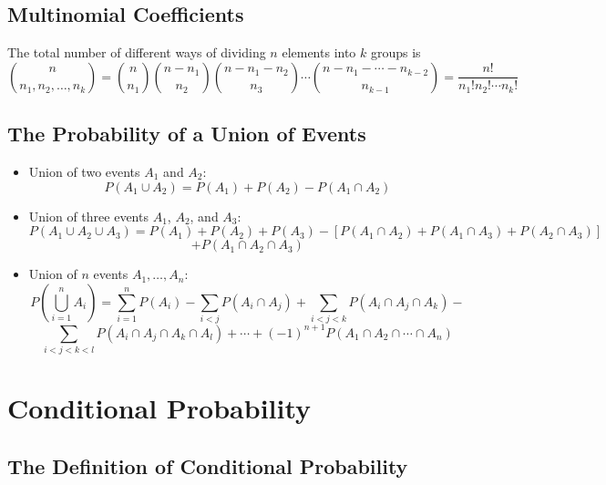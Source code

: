\documentclass[11pt]{article}
\begin{document}
\subsection{Multinomial Coefficients}

The total number of different ways of dividing $n$ elements into $k$ groups is 
\[ {n \choose n_1, n_2, \ldots, n_k} = {n \choose n_1} {n - n_1 \choose n_2} {n - n_1 - n_2 
\choose n_3} \cdots {n - n_1 - \cdots - n_{k-2} \choose n_{k-1}} = \frac{n!}{n_1!n_2! \cdots 
n_k!}\]

\subsection{The Probability of a Union of Events}

\begin{itemize}
    \item Union of two events $A_1$ and $A_2$: \[P(A_1 \cup A_2) = P(A_1) + P(A_2) - P(A_1 \cap
    A_2)\]
    \item Union of three events $A_1$, $A_2$, and $A_3$: \[P(A_1 \cup A_2 \cup A_3) = P(A_1) + 
    P(A_2) + P(A_3) - \left[ P(A_1 \cap A_2) + P(A_1 \cap A_3) + P(A_2 \cap A_3) \right] \] \[ 
    + P(A_1 \cap A_2 \cap A_3)\]
    \item Union of $n$ events $A_1, \ldots, A_n$: \[ P \left(\bigcup_{i=1}^{n} A_i\right) = 
    \sum_{i=1}^{n} P(A_i) - \sum_{i<j}P(A_i \cap A_j) + \sum_{i<j<k}P(A_i \cap A_j \cap A_k) -
    \] \[ \sum_{i<j<k<l} P(A_i \cap A_j \cap A_k \cap A_l) + \cdots + {(-1)}^{n+1} P(A_1 \cap 
    A_2 \cap \cdots \cap A_n)\]
\end{itemize}

\section{Conditional Probability}

\subsection{The Definition of Conditional Probability}
\end{document}
